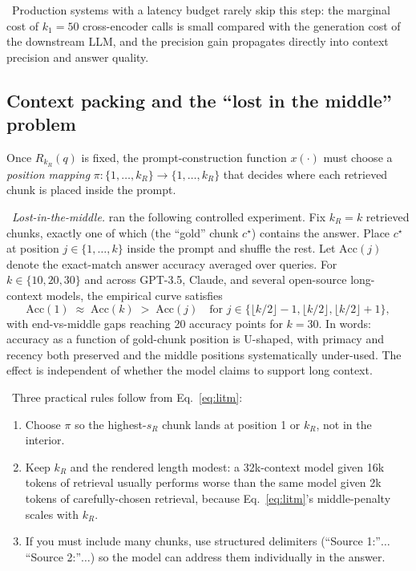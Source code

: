 \Cons\ Production systems with a latency budget rarely skip this
step: the marginal cost of $k_1 = 50$ cross-encoder calls is small
compared with the generation cost of the downstream LLM, and the
precision gain propagates directly into context precision and
answer quality.

\subsection{Context packing and the ``lost in the middle'' problem}

Once $R_{k_R}(q)$ is fixed, the prompt-construction function
$x(\cdot)$ must choose a \emph{position mapping}
$\pi : \{1, \dots, k_R\} \to \{1, \dots, k_R\}$ that decides where
each retrieved chunk is placed inside the prompt.

\Emp\ \emph{Lost-in-the-middle.} \citet{liu2024lost} ran the
following controlled experiment. Fix $k_R = k$ retrieved chunks,
exactly one of which (the ``gold'' chunk $c^\star$) contains the
answer. Place $c^\star$ at position $j \in \{1, \dots, k\}$ inside
the prompt and shuffle the rest. Let $\mathrm{Acc}(j)$ denote the
exact-match answer accuracy averaged over queries. For
$k \in \{10, 20, 30\}$ and across GPT-3.5, Claude, and several
open-source long-context models, the empirical curve satisfies
\begin{equation}
  \mathrm{Acc}(1) \;\approx\; \mathrm{Acc}(k) \;>\; \mathrm{Acc}(j)
  \quad \text{for } j \in \{\lfloor k/2 \rfloor - 1, \lfloor k/2
  \rfloor, \lfloor k/2 \rfloor + 1\},
  \label{eq:litm}
\end{equation}
with end-vs-middle gaps reaching 20 accuracy points for $k = 30$.
In words: accuracy as a function of gold-chunk position is
U-shaped, with primacy and recency both preserved and the middle
positions systematically under-used. The effect is independent of
whether the model claims to support long context.

\Cons\ Three practical rules follow from Eq.~\eqref{eq:litm}:
\begin{enumerate}
  \item Choose $\pi$ so the highest-$s_R$ chunk lands at position 1
        or $k_R$, not in the interior.
  \item Keep $k_R$ and the rendered length modest: a 32k-context
        model given 16k tokens of retrieval usually performs worse
        than the same model given 2k tokens of carefully-chosen
        retrieval, because Eq.~\eqref{eq:litm}'s middle-penalty
        scales with $k_R$.
  \item If you must include many chunks, use structured
        delimiters (``Source 1:''$\dots$``Source 2:''$\dots$) so the
        model can address them individually in the answer.
\end{enumerate}

